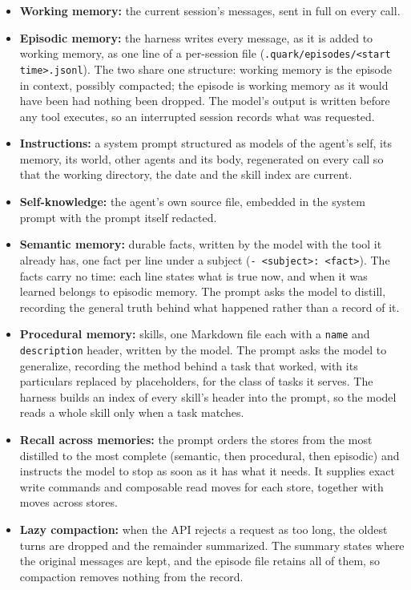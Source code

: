 \begin{itemize}
\tightlist
\item
  \textbf{Working memory:} the current session's messages, sent in full on every call.
\item
  \textbf{Episodic memory:} the harness writes every message, as it is added to working memory, as one line of a per-session file (\passthrough{\lstinline!.quark/episodes/<start time>.jsonl!}). The two share one structure: working memory is the episode in context, possibly compacted; the episode is working memory as it would have been had nothing been dropped. The model's output is written before any tool executes, so an interrupted session records what was requested.
\item
  \textbf{Instructions:} a system prompt structured as models of the agent's self, its memory, its world, other agents and its body, regenerated on every call so that the working directory, the date and the skill index are current.
\item
  \textbf{Self-knowledge:} the agent's own source file, embedded in the system prompt with the prompt itself redacted.
\item
  \textbf{Semantic memory:} durable facts, written by the model with the tool it already has, one fact per line under a subject (\passthrough{\lstinline!- <subject>: <fact>!}). The facts carry no time: each line states what is true now, and when it was learned belongs to episodic memory. The prompt asks the model to distill, recording the general truth behind what happened rather than a record of it.
\item
  \textbf{Procedural memory:} skills, one Markdown file each with a \passthrough{\lstinline!name!} and \passthrough{\lstinline!description!} header, written by the model. The prompt asks the model to generalize, recording the method behind a task that worked, with its particulars replaced by placeholders, for the class of tasks it serves. The harness builds an index of every skill's header into the prompt, so the model reads a whole skill only when a task matches.
\item
  \textbf{Recall across memories:} the prompt orders the stores from the most distilled to the most complete (semantic, then procedural, then episodic) and instructs the model to stop as soon as it has what it needs. It supplies exact write commands and composable read moves for each store, together with moves across stores.
\item
  \textbf{Lazy compaction:} when the API rejects a request as too long, the oldest turns are dropped and the remainder summarized. The summary states where the original messages are kept, and the episode file retains all of them, so compaction removes nothing from the record.
\end{itemize}

